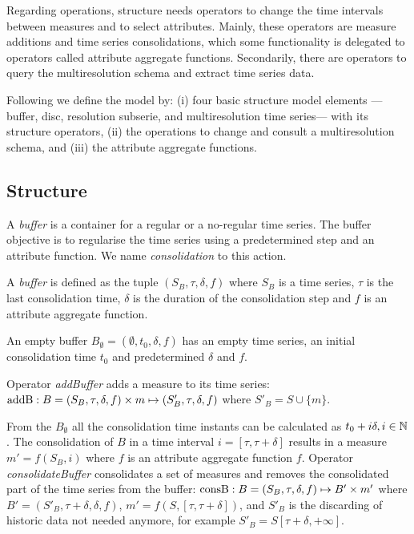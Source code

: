 Regarding operations,  structure needs operators to change
the time intervals between measures and to select attributes. Mainly,
these operators are measure additions and time series consolidations,
which some functionality is delegated to operators called attribute
aggregate functions. Secondarily, there are operators to query the
multiresolution schema and extract time series data.


Following we define the  model by: (i) four basic
structure model elements ---buffer, disc, resolution subserie, and
multiresolution time series--- with its structure operators, (ii) the
operations to change and consult a multiresolution schema, and (iii)
the attribute aggregate functions.



\subsection{Structure}

A \emph{buffer} is a container for a regular or a no-regular time
series. The buffer objective is to regularise the time series using a
predetermined step and an attribute function. We name
\emph{consolidation} to this action.
\begin{definition}%
  A \emph{buffer} is defined as the tuple $(S_B,\tau,\delta,f)$ where
  $S_B$ is a time series, $\tau$ is the last consolidation time,
  $\delta$ is the duration of the consolidation step and $f$ is an
  attribute aggregate function.

  An empty buffer $B_{\emptyset} = (\emptyset,t_0, \delta, f)$ has an
  empty time series, an initial consolidation time $t_0$ and
  predetermined $\delta$ and $f$.
\end{definition}

Operator \emph{addBuffer} adds a measure to its time series:
$\operatorname{addB}: B = (S_B,\tau,\delta,f) \times m \mapsto
(S'_B,\tau,\delta,f)$ where $S'_B = S \cup \{m\} $.

From the $B_{\emptyset}$ all the consolidation time instants can be
calculated as $t_0+i\delta, i\in\mathbb{N}$. The consolidation of $B$ in a
time interval $i=[\tau,\tau+\delta]$ results in a measure
$m'=f(S_B,i)$ where $f$ is an attribute aggregate function
$f$. Operator \emph{consolidateBuffer} consolidates a set of measures
and removes the consolidated part of the time series from the buffer:
$\operatorname{consB} : B=(S_B,\tau,\delta,f) \mapsto B' \times m'$ where $ B'=
(S'_B,\tau+\delta,\delta,f)$, $m' = f(S,[\tau,\tau+\delta])$, and
$S'_B$ is the discarding of historic data not needed anymore, for example
$S'_B = S[\tau+\delta,+\infty]$.

